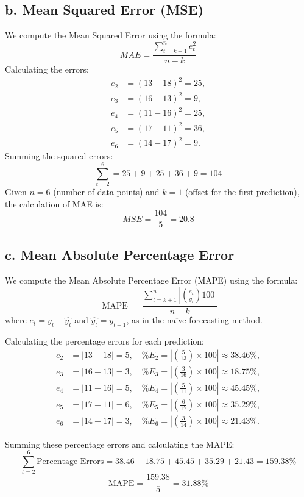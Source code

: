 \documentclass{report}
\begin{document}
\subsection*{b. Mean Squared Error (MSE)}
We compute the Mean Squared Error using the formula:
\[ MAE = \dfrac{\displaystyle \sum_{t = k + 1}^{n} e_t^2}{n-k} \]
\bigbreak \noindent
Calculating the errors:
\[ \begin{aligned}
e_2 &= (13 - 18)^2 = 25, \\
e_3 &= (16 - 13)^2 = 9, \\
e_4 &= (11 - 16)^2 = 25, \\
e_5 &= (17 - 11)^2 = 36, \\
e_6 &= (14 - 17)^2 = 9.
\end{aligned} \]
\bigbreak \noindent
Summing the squared errors:
$$\displaystyle\sum_{t = 2}^{6} = 25 + 9+25+36+9 = 104$$
\bigbreak \noindent
Given \( n = 6 \) (number of data points) and \( k = 1 \) (offset for the first prediction), the calculation of MAE is:
$$ MSE = \dfrac{104}{5} = 20.8$$
\subsection*{c. Mean Absolute Percentage Error}
We compute the Mean Absolute Percentage Error (MAPE) using the formula:
$$
\text { MAPE }=\dfrac{\displaystyle\sum_{t=k+1}^n\left|\left(\frac{e_t}{y_t}\right) 100\right|}{n-k}
$$
where \( e_t = y_t - \hat{y_t} \) and \( \hat{y_t} = y_{t-1} \), as in the naïve forecasting method.

\noindent Calculating the percentage errors for each prediction:
\[ \begin{aligned}
e_2 &= |13 - 18| = 5, \quad \%E_2 = \left| \left(\frac{5}{13}\right) \times 100 \right| \approx 38.46\%, \\
e_3 &= |16 - 13| = 3, \quad \%E_3 = \left| \left(\frac{3}{16}\right) \times 100 \right| \approx 18.75\%, \\
e_4 &= |11 - 16| = 5, \quad \%E_4 = \left| \left(\frac{5}{11}\right) \times 100 \right| \approx 45.45\%, \\
e_5 &= |17 - 11| = 6, \quad \%E_5 = \left| \left(\frac{6}{17}\right) \times 100 \right| \approx 35.29\%, \\
e_6 &= |14 - 17| = 3, \quad \%E_6 = \left| \left(\frac{3}{14}\right) \times 100 \right| \approx 21.43\%.
\end{aligned} \]

\noindent Summing these percentage errors and calculating the MAPE:
\[ \sum_{t = 2}^{6} \text{Percentage Errors} = 38.46 + 18.75 + 45.45 + 35.29 + 21.43 = 159.38\% \]
\[ \text{MAPE} = \dfrac{159.38}{5} = 31.88\% \]
\end{document}
